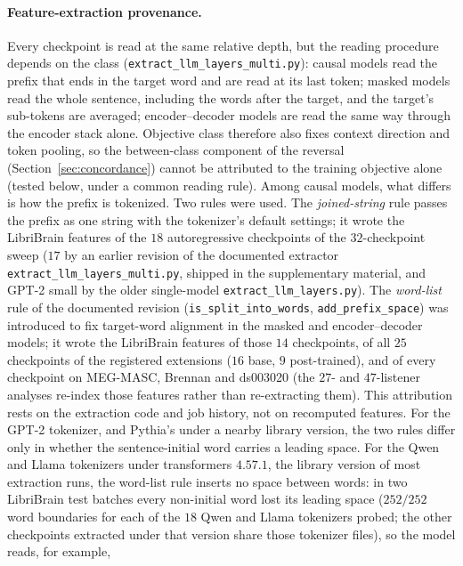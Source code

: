 \documentclass{article}
\begin{document}
\paragraph{Feature-extraction provenance.}\label{app:extract-provenance} Every checkpoint is read
at the same relative depth, but the reading procedure depends on the class
(\texttt{extract\_llm\_layers\_multi.py}): causal models read the prefix that ends in the target
word and are read at its last token; masked models read the whole sentence, including the words
after the target, and the target's sub-tokens are averaged; encoder--decoder models are read the
same way through the encoder stack alone. Objective class therefore also fixes context direction and
token pooling, so the between-class component of the reversal (Section~\ref{sec:concordance}) cannot
be attributed to the training objective alone (tested below, under a common reading rule). Among causal models, what differs is how the prefix
is tokenized. Two rules were used. The \emph{joined-string} rule passes the prefix as one string with the tokenizer's default
settings; it wrote the LibriBrain features of the $18$ autoregressive checkpoints of the
$32$-checkpoint sweep ($17$ by an earlier revision of the documented extractor
\texttt{extract\_llm\_layers\_multi.py}, shipped in the supplementary material, and GPT-2 small by
the older single-model \texttt{extract\_llm\_layers.py}). The \emph{word-list} rule of the
documented revision (\texttt{is\_split\_into\_words}, \texttt{add\_prefix\_space}) was introduced to
fix target-word alignment in the masked and encoder--decoder models; it wrote the LibriBrain
features of those $14$ checkpoints, of all $25$ checkpoints of the registered extensions ($16$ base,
$9$ post-trained), and of every checkpoint on MEG-MASC, Brennan and ds003020 (the $27$- and
$47$-listener analyses re-index those features rather than re-extracting them). This attribution
rests on the extraction code and job history, not on recomputed features. For the GPT-2 tokenizer,
and Pythia's under a nearby library version, the two rules differ only in whether the
sentence-initial word carries a leading space. For the Qwen and Llama tokenizers under transformers
$4.57.1$, the library version of most extraction runs, the word-list rule inserts no space between
words: in two LibriBrain test batches every non-initial word lost its leading space ($252/252$ word
boundaries for each of the $18$ Qwen and Llama tokenizers probed; the other checkpoints extracted
under that version share those tokenizer files), so the model reads, for example,
\end{document}
